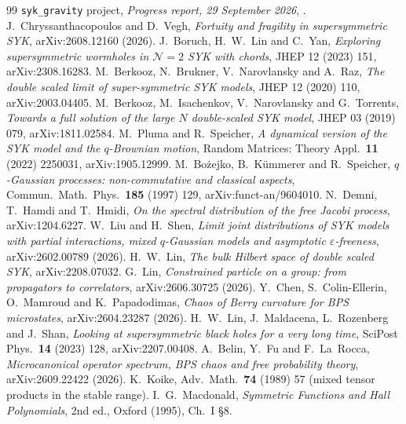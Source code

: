 \documentclass[11pt]{article}
\theoremstyle{remark}
\begin{document}
\begin{thebibliography}{99}\small
{} \texttt{syk\_gravity} project, \emph{Progress report, 29 September 2026}, .
 J.~Chryssanthacopoulos and D.~Vegh, \emph{Fortuity and fragility in supersymmetric SYK}, arXiv:2608.12160 (2026).
 J.~Boruch, H.~W.~Lin and C.~Yan, \emph{Exploring supersymmetric wormholes in $\mathcal N=2$ SYK with chords}, JHEP 12 (2023) 151, arXiv:2308.16283.
 M.~Berkooz, N.~Brukner, V.~Narovlansky and A.~Raz, \emph{The double scaled limit of super-symmetric SYK models}, JHEP 12 (2020) 110, arXiv:2003.04405.
 M.~Berkooz, M.~Isachenkov, V.~Narovlansky and G.~Torrents, \emph{Towards a full solution of the large $N$ double-scaled SYK model}, JHEP 03 (2019) 079, arXiv:1811.02584.
 M.~Pluma and R.~Speicher, \emph{A dynamical version of the SYK model and the $q$-Brownian motion}, Random Matrices: Theory Appl.\ \textbf{11} (2022) 2250031, arXiv:1905.12999.
 M.~Bożejko, B.~Kümmerer and R.~Speicher, \emph{$q$-Gaussian processes: non-commutative and classical aspects}, Commun.\ Math.\ Phys.\ \textbf{185} (1997) 129, arXiv:funct-an/9604010.
 N.~Demni, T.~Hamdi and T.~Hmidi, \emph{On the spectral distribution of the free Jacobi process}, arXiv:1204.6227.
 W.~Liu and H.~Shen, \emph{Limit joint distributions of SYK models with partial interactions, mixed $q$-Gaussian models and asymptotic $\varepsilon$-freeness}, arXiv:2602.00789 (2026).
 H.~W.~Lin, \emph{The bulk Hilbert space of double scaled SYK}, arXiv:2208.07032.
 G.~Lin, \emph{Constrained particle on a group: from propagators to correlators}, arXiv:2606.30725 (2026).
 Y.~Chen, S.~Colin-Ellerin, O.~Mamroud and K.~Papadodimas, \emph{Chaos of Berry curvature for BPS microstates}, arXiv:2604.23287 (2026).
 H.~W.~Lin, J.~Maldacena, L.~Rozenberg and J.~Shan, \emph{Looking at supersymmetric black holes for a very long time}, SciPost Phys.\ \textbf{14} (2023) 128, arXiv:2207.00408.
 A.~Belin, Y.~Fu and F.~La~Rocca, \emph{Microcanonical operator spectrum, BPS chaos and free probability theory}, arXiv:2609.22422 (2026).
 K.~Koike, Adv.\ Math.\ \textbf{74} (1989) 57 (mixed tensor products in the stable range).
 I.~G.~Macdonald, \emph{Symmetric Functions and Hall Polynomials}, 2nd ed., Oxford (1995), Ch.~I \S8.
\end{thebibliography}
\end{document}

